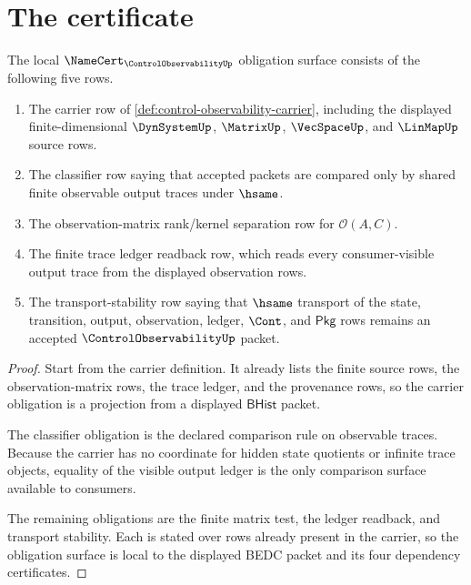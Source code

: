 \section{The certificate}
\label{sec:control-observability-certificate}

\begin{theorem}
\label{thm:control-observability-namecert-obligation-surface}
The local $\NameCert_{\ControlObservabilityUp}$ obligation surface consists of the following five rows.

\begin{enumerate}
\item The carrier row of \autoref{def:control-observability-carrier}, including the displayed finite-dimensional $\DynSystemUp$, $\MatrixUp$, $\VecSpaceUp$, and $\LinMapUp$ source rows.

\item The classifier row saying that accepted packets are compared only by shared finite observable output traces under $\hsame$.

\item The observation-matrix rank/kernel separation row for $\mathcal O(A,C)$.

\item The finite trace ledger readback row, which reads every consumer-visible output trace from the displayed observation rows.

\item The transport-stability row saying that $\hsame$ transport of the state, transition, output, observation, ledger, $\Cont$, and $\mathsf{Pkg}$ rows remains an accepted $\ControlObservabilityUp$ packet.
\end{enumerate}
\end{theorem}
\begin{proof}
Start from the carrier definition. It already lists the finite source rows, the observation-matrix rows, the trace ledger, and the provenance rows, so the carrier obligation is a projection from a displayed $\mathsf{BHist}$ packet.

The classifier obligation is the declared comparison rule on observable traces. Because the carrier has no coordinate for hidden state quotients or infinite trace objects, equality of the visible output ledger is the only comparison surface available to consumers.

The remaining obligations are the finite matrix test, the ledger readback, and transport stability. Each is stated over rows already present in the carrier, so the obligation surface is local to the displayed BEDC packet and its four dependency certificates.
\end{proof}

